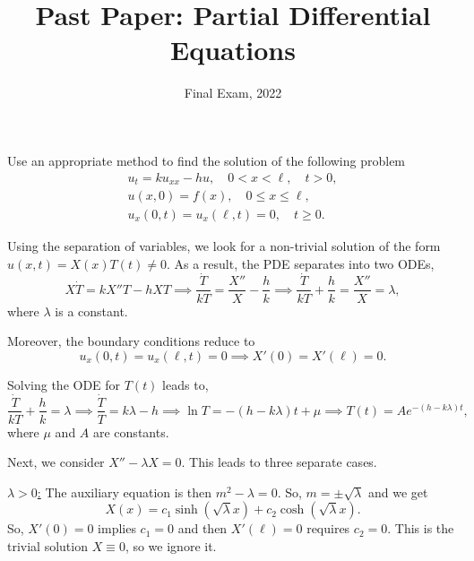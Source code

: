 \documentclass[11pt]{penrose}
\title{Past Paper: Partial Differential Equations}
\subtitle{Final Exam, 2022}
\begin{document}
\maketitle
\warningtext

\begin{problem}{1}
    Use an appropriate method to find the solution of the following problem
    \begin{gather*}
        u_t = k u_{xx} - h u, \quad 0 < x < \ell, \quad t > 0,\\
        u(x, 0) = f(x), \quad 0 \leq x \leq \ell,\\
        u_x(0, t) = u_x(\ell, t) = 0, \quad t \geq 0.
    \end{gather*}
    
    \solution
    Using the separation of variables, we look for a non-trivial solution of the form $u(x,t) = X(x)T(t) \neq 0$. As a result, the PDE separates into two ODEs,
    \begin{equation*}
        X\dot{T} = kX''T - hXT
        \implies
        \frac{\dot{T}}{kT} = \frac{X''}{X} - \frac{h}{k}
        \implies
        \frac{\dot{T}}{kT} + \frac{h}{k} = \frac{X''}{X} = \lambda,
    \end{equation*}
    where $\lambda$ is a constant.

    Moreover, the boundary conditions reduce to
    \begin{equation*}
        u_x(0, t) = u_x(\ell, t) = 0
        \implies
        X'(0) = X'(\ell) = 0.
    \end{equation*}

    Solving the ODE for $T(t)$ leads to,
    \begin{equation*}
        \frac{\dot{T}}{kT} + \frac{h}{k} = \lambda
        \implies
        \frac{\dot{T}}{T} = k\lambda - h
        \implies
        \ln T = -(h - k\lambda)t + \mu
        \implies
        T(t) = A e^{-(h - k\lambda)t},
    \end{equation*}
    where $\mu$ and $A$ are constants.

    Next, we consider $X'' - \lambda X = 0$. This leads to three separate cases.

    \underline{$\lambda > 0$:} The auxiliary equation is then $m^2 - \lambda = 0$. So, $m = \pm \sqrt{\lambda}$ and we get
    \begin{equation*}
        X(x) = c_1 \sinh(\sqrt{\lambda}x) + c_2 \cosh(\sqrt{\lambda}x).
    \end{equation*}
    So, $X'(0) = 0$ implies $c_1 = 0$ and then $X'(\ell) = 0$ requires $c_2 = 0$. This is the trivial solution $X \equiv 0$, so we ignore it.


\end{problem}
\end{document}
